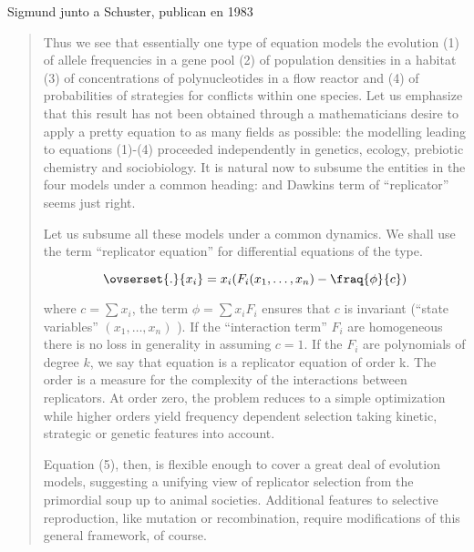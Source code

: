 \documentclass[a4paper,10pt]{article}
\begin{document}
Sigmund junto a Schuster, publican en 1983
\begin{quotation} \cite{schuster1983-replicatorDynamics}
    Thus we see that essentially one type of equation models the evolution (1) of allele frequencies in a gene pool (2) of population densities in a habitat (3) of concentrations of polynucleotides in a flow reactor and (4) of probabilities of strategies for conflicts within one species.
    Let us emphasize that this result has not been obtained through a mathematicians desire to apply a pretty equation to as many fields as possible: the modelling leading to equations (1)-(4) proceeded independently in genetics, ecology, prebiotic chemistry and sociobiology.
    It is natural now to subsume the entities in the four models under a common heading: and Dawkins term of ``replicator'' seems just right.
    
    Let us subsume all these models under a common dynamics. We shall use the term ``replicator equation'' for differential equations of the type.
    
    \begin{equation}
    \ovserset{.}{x_i} = x_i (F_i(x_1, \dots, x_n) - \fraq{\phi}{c})
    \end{equation}
    
    where $c=\sum x_i$, the term $\phi = \sum x_i F_i$ ensures that $c$ is invariant (``state variables'' $(x_1, \dots, x_n)$ ).
    If the ``interaction term'' $F_i$ are homogeneous there is no loss in generality in assuming $c = 1$.
    If the $F_i$ are polynomials of degree $k$, we say that equation is a replicator equation of order k.
    The order is a measure for the complexity of the interactions between replicators.
    At order zero, the problem reduces to a simple optimization while higher orders yield frequency dependent selection taking kinetic, strategic or genetic features into account.
    
    Equation (5), then, is flexible enough to cover a great deal of evolution models, suggesting a unifying view of replicator selection from the primordial soup up to animal societies.
    Additional features to selective reproduction, like mutation or recombination, require modifications of this general framework, of course.
    
\end{quotation}
\end{document}
